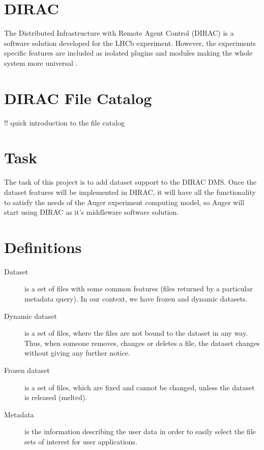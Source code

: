 \section*{DIRAC}
The Distributed Infrastructure with Remote Agent Control (DIRAC) is a software solution developed for the LHCb experiment. However, the experiments specific features are included as isolated plugins and modules making the whole system more universal \cite{Dir1}.

\section*{DIRAC File Catalog}
!! quick introduction to the file catalog

\section*{Task}
The task of this project is to add dataset support to the DIRAC DMS. Once the dataset features will 
be implemented in DIRAC, it will have all the functionality
to satisfy the needs of the Auger experiment computing model, so Auger will start using
DIRAC as it’s middleware software solution.

\section*{Definitions}
\begin{description}
\item[Dataset] is a set of files with some common features (files returned by a particular metadata query). In our context, we have frozen and dynamic datasets.
\item[Dynamic dataset] is a set of files, where the files are not bound to the dataset in any way. Thus, when someone removes, changes or deletes a file, the dataset changes without giving any further notice.
\item[Frozen dataset] is a set of files, which are fixed and cannot be changed, unless the dataset is released (melted).
\item[Metadata] is the information describing the user data in order to easily select the file sets of interest for user applications.
\end{description}
